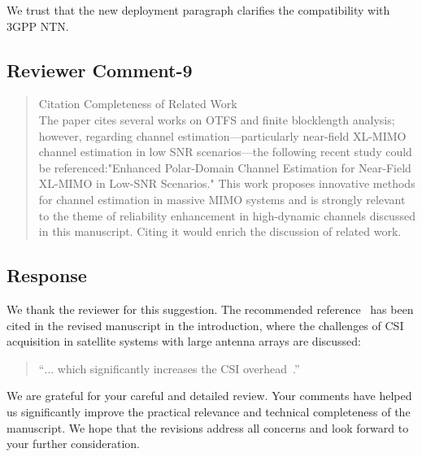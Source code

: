 We trust that the new deployment paragraph clarifies the compatibility with 3GPP NTN.


\subsection{Reviewer Comment-9}



\begin{mdframed}
\begin{quote}
Citation Completeness of Related Work \\
   The paper cites several works on OTFS and finite blocklength analysis; however, regarding channel estimation—particularly near-field XL-MIMO channel estimation in low SNR scenarios—the following recent study could be referenced:"Enhanced Polar-Domain Channel Estimation for Near-Field XL-MIMO in Low-SNR Scenarios." This work proposes innovative methods for channel estimation in massive MIMO systems and is strongly relevant to the theme of reliability enhancement in high-dynamic channels discussed in this manuscript. Citing it would enrich the discussion of related work. 



\end{quote}

\end{mdframed}


\subsection{Response}

We thank the reviewer for this suggestion. The recommended reference~\cite{Wang2025PolarXLMIMO} has been cited in the revised manuscript in the introduction, where the challenges of CSI acquisition in satellite systems with large antenna arrays are discussed:

\begin{quote}
``$\ldots$ which significantly increases the CSI overhead~{\color{blue}\cite{Wang2025PolarXLMIMO}}.''
\end{quote}
\vskip 0.2in
We are grateful for your careful and detailed review. Your comments have helped us significantly improve the practical relevance and technical completeness of the manuscript. We hope that the revisions address all concerns and look forward to your further consideration.
